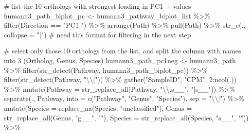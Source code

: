 \documentclass[
  letterpaper,
]{book}
\newenvironment{Shaded}{}{}
\newcommand{\AttributeTok}[1]{\textcolor[rgb]{0.84,0.23,0.29}{#1}}
\newcommand{\CommentTok}[1]{\textcolor[rgb]{0.42,0.45,0.49}{#1}}
\newcommand{\DecValTok}[1]{\textcolor[rgb]{0.00,0.36,0.77}{#1}}
\newcommand{\FunctionTok}[1]{\textcolor[rgb]{0.44,0.26,0.76}{#1}}
\newcommand{\NormalTok}[1]{\textcolor[rgb]{0.14,0.16,0.18}{#1}}
\newcommand{\OtherTok}[1]{\textcolor[rgb]{0.44,0.26,0.76}{#1}}
\newcommand{\SpecialCharTok}[1]{\textcolor[rgb]{0.00,0.36,0.77}{#1}}
\newcommand{\StringTok}[1]{\textcolor[rgb]{0.01,0.18,0.38}{#1}}
\begin{document}
\begin{Shaded}
\begin{Highlighting}[]
\CommentTok{\# list the 10 orthologs with strongest loading in PC1 + values}
\NormalTok{humann3\_path\_biplot\_pc }\OtherTok{\textless{}{-}}\NormalTok{ humann3\_pathway\_biplot\_list }\SpecialCharTok{\%\textgreater{}\%}
  \FunctionTok{filter}\NormalTok{(Direction }\SpecialCharTok{==} \StringTok{"PC1{-}"}\NormalTok{) }\SpecialCharTok{\%\textgreater{}\%}
  \FunctionTok{arrange}\NormalTok{(Path) }\SpecialCharTok{\%\textgreater{}\%}
  \FunctionTok{pull}\NormalTok{(Path) }\SpecialCharTok{\%\textgreater{}\%}
  \FunctionTok{str\_c}\NormalTok{(., }\AttributeTok{collapse =} \StringTok{"|"}\NormalTok{) }\CommentTok{\# need this format for filtering in the next step}

\CommentTok{\# select only those 10 orthologs from the list, and split the column with names into 3 (Ortholog, Genus, Species)}
\NormalTok{humann3\_path\_pc1neg }\OtherTok{\textless{}{-}}\NormalTok{ humann3\_path }\SpecialCharTok{\%\textgreater{}\%}
  \FunctionTok{filter}\NormalTok{(}\FunctionTok{str\_detect}\NormalTok{(Pathway, humann3\_path\_biplot\_pc)) }\SpecialCharTok{\%\textgreater{}\%}
  \FunctionTok{filter}\NormalTok{(}\FunctionTok{str\_detect}\NormalTok{(Pathway, }\StringTok{"}\SpecialCharTok{\textbackslash{}\textbackslash{}}\StringTok{|"}\NormalTok{)) }\SpecialCharTok{\%\textgreater{}\%}
  \FunctionTok{gather}\NormalTok{(}\StringTok{"SampleID"}\NormalTok{, }\StringTok{"CPM"}\NormalTok{, }\DecValTok{2}\SpecialCharTok{:}\FunctionTok{ncol}\NormalTok{(.)) }\SpecialCharTok{\%\textgreater{}\%}
  \FunctionTok{mutate}\NormalTok{(}\AttributeTok{Pathway =} \FunctionTok{str\_replace\_all}\NormalTok{(Pathway, }\StringTok{"}\SpecialCharTok{\textbackslash{}\textbackslash{}}\StringTok{.s\_\_"}\NormalTok{, }\StringTok{"|s\_\_"}\NormalTok{)) }\SpecialCharTok{\%\textgreater{}\%}
  \FunctionTok{separate}\NormalTok{(., Pathway, }\AttributeTok{into =} \FunctionTok{c}\NormalTok{(}\StringTok{"Pathway"}\NormalTok{, }\StringTok{"Genus"}\NormalTok{, }\StringTok{"Species"}\NormalTok{), }\AttributeTok{sep =} \StringTok{"}\SpecialCharTok{\textbackslash{}\textbackslash{}}\StringTok{|"}\NormalTok{) }\SpecialCharTok{\%\textgreater{}\%}
  \FunctionTok{mutate}\NormalTok{(}\AttributeTok{Species =} \FunctionTok{replace\_na}\NormalTok{(Species, }\StringTok{"unclassified"}\NormalTok{),}
         \AttributeTok{Genus =} \FunctionTok{str\_replace\_all}\NormalTok{(Genus, }\StringTok{"g\_\_"}\NormalTok{, }\StringTok{""}\NormalTok{),}
         \AttributeTok{Species =} \FunctionTok{str\_replace\_all}\NormalTok{(Species, }\StringTok{"s\_\_"}\NormalTok{, }\StringTok{""}\NormalTok{)) }\SpecialCharTok{\%\textgreater{}\%}

\end{Highlighting}
\end{Shaded}
\end{document}
